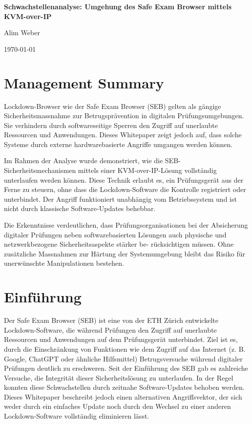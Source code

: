 \documentclass[14pt]{article}
\begin{document}
\begin{titlepage}
    \centering
    \vspace*{5cm}
    {\huge\bfseries Schwachstellenanalyse: Umgehung des Safe Exam Browser mittels KVM-over-IP\par}
    \vspace{1.5cm}
    {\large Alim Weber\par}

    {\large \today\par}
\end{titlepage}

\newpage
\section*{Management Summary}
Lockdown-Browser wie der Safe Exam Browser (SEB) gelten als gängige Sicherheitsmassnahme zur Betrugsprävention in digitalen Prüfungsumgebungen. Sie verhindern durch softwareseitige Sperren den Zugriff auf unerlaubte Ressourcen und Anwendungen. Dieses Whitepaper zeigt jedoch auf, dass solche Systeme durch externe hardwarebasierte Angriffe umgangen werden können.

Im Rahmen der Analyse wurde demonstriert, wie die SEB-Sicherheitsmechanismen mittels einer KVM-over-IP-Lösung vollständig unterlaufen werden können. Diese Technik erlaubt es, ein Prüfungsgerät aus der Ferne zu steuern, ohne dass die Lockdown-Software die Kontrolle registriert oder unterbindet. Der Angriff funktioniert unabhängig vom Betriebssystem und ist nicht durch klassische Software-Updates behebbar.

Die Erkenntnisse verdeutlichen, dass Prüfungsorganisationen bei der Absicherung digitaler Prüfungen neben softwarebasierten Lösungen auch physische und netzwerkbezogene Sicherheitsaspekte stärker be- rücksichtigen müssen. Ohne zusätzliche Massnahmen zur Härtung der Systemumgebung bleibt das Risiko für unerwünschte Manipulationen bestehen.

\newpage
\tableofcontents

\newpage
\section{Einführung}
Der Safe Exam Browser (SEB) ist eine von der ETH Zürich entwickelte Lockdown-Software, die während Prüfungen den Zugriff auf unerlaubte Ressourcen und Anwendungen auf dem Prüfungsgerät unterbindet. Ziel ist es, durch die Einschränkung von Funktionen wie dem Zugriff auf das Internet (z. B. Google, ChatGPT oder ähnliche Hilfsmittel) Betrugsversuche während digitaler Prüfungen deutlich zu erschweren. Seit der Einführung des SEB gab es zahlreiche Versuche, die Integrität dieser Sicherheitslösung zu unterlaufen. In der Regel konnten diese Schwachstellen durch zeitnahe Software-Updates behoben werden. Dieses Whitepaper beschreibt jedoch einen alternativen Angriffsvektor, der sich weder durch ein einfaches Update noch durch den Wechsel zu einer anderen Lockdown-Software vollständig eliminieren lässt.
\end{document}
